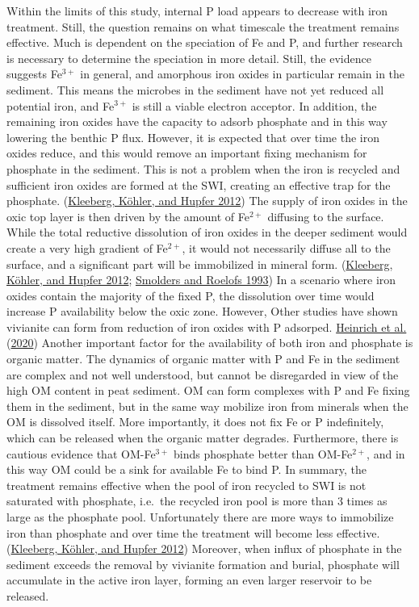 \documentclass[a4paper,11pt]{article}
\begin{document}
Within the limits of this study, internal P load appears to decrease with iron treatment. Still, the question remains on what timescale the treatment remains effective. Much is dependent on the speciation of Fe and P, and further research is necessary to determine the speciation in more detail. Still, the evidence suggests Fe\(^{3+}\) in general, and amorphous iron oxides in particular remain in the sediment. This means the microbes in the sediment have not yet reduced all potential iron, and Fe\(^{3+}\) is still a viable electron acceptor. In addition, the remaining iron oxides have the capacity to adsorb phosphate and in this way lowering the benthic P flux. However, it is expected that over time the iron oxides reduce, and this would remove an important fixing mechanism for phosphate in the sediment. This is not a problem when the iron is recycled and sufficient iron oxides are formed at the SWI, creating an effective trap for the phosphate. (\protect\hyperlink{ref-kleebergHowEffectivelyDoes2012}{Kleeberg, Köhler, and Hupfer 2012}) The supply of iron oxides in the oxic top layer is then driven by the amount of Fe\(^{2+}\) diffusing to the surface. While the total reductive dissolution of iron oxides in the deeper sediment would create a very high gradient of Fe\(^{2+}\), it would not necessarily diffuse all to the surface, and a significant part will be immobilized in mineral form. (\protect\hyperlink{ref-kleebergHowEffectivelyDoes2012}{Kleeberg, Köhler, and Hupfer 2012}; \protect\hyperlink{ref-smoldersSulphatemediatedIronLimitation1993}{Smolders and Roelofs 1993}) In a scenario where iron oxides contain the majority of the fixed P, the dissolution over time would increase P availability below the oxic zone. However, Other studies have shown vivianite can form from reduction of iron oxides with P adsorped. \protect\hyperlink{ref-heinrichTransformationRedoxsensitiveRedoxstable2020}{Heinrich et al.} (\protect\hyperlink{ref-heinrichTransformationRedoxsensitiveRedoxstable2020}{2020}) Another important factor for the availability of both iron and phosphate is organic matter. The dynamics of organic matter with P and Fe in the sediment are complex and not well understood, but cannot be disregarded in view of the high OM content in peat sediment. OM can form complexes with P and Fe fixing them in the sediment, but in the same way mobilize iron from minerals when the OM is dissolved itself. More importantly, it does not fix Fe or P indefinitely, which can be released when the organic matter degrades. Furthermore, there is cautious evidence that OM-Fe\(^{3+}\) binds phosphate better than OM-Fe\(^{2+}\), and in this way OM could be a sink for available Fe to bind P. In summary, the treatment remains effective when the pool of iron recycled to SWI is not saturated with phosphate, i.e.~the recycled iron pool is more than 3 times as large as the phosphate pool. Unfortunately there are more ways to immobilize iron than phosphate and over time the treatment will become less effective. (\protect\hyperlink{ref-kleebergHowEffectivelyDoes2012}{Kleeberg, Köhler, and Hupfer 2012}) Moreover, when influx of phosphate in the sediment exceeds the removal by vivianite formation and burial, phosphate will accumulate in the active iron layer, forming an even larger reservoir to be released.
\end{document}
